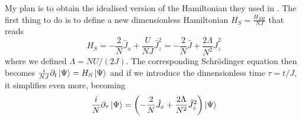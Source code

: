 My plan is to obtain the idealised version of the Hamiltonian they used in \cite{FastGenerationJulia2012}.
The first thing to do is to define a new dimensionless Hamiltonian $ H_{S} = \frac{H_{BH}}{NJ} $ that reads
\begin{equation}
	\label{eq:DimensionlessBoseHubbardHamiltonian}
	H_{S} = -\frac{2}{N}\hat{J}_x +\frac{U}{NJ}\hat{J}_z ^{2} = -\frac{2}{N} \hat{J}+ \frac{2\Lambda}{N^2}\hat{J}_z^2
\end{equation}
where we defined $ \Lambda = NU/(2J) $.
The corresponding Schr{\"o}dinger equation then becomes $ \frac{i}{NJ}\partial_t\ket{\Psi} = H_{S}\ket{\Psi} $ and if we introduce the dimensionless time $ \tau = t/J $, it simplifies even more, becoming
\begin{equation}
	\label{eq:SchrodingerEquationDimensionless}
	\frac{i}{N}\partial_{\tau} \ket{\Psi} =
	\left(
	-\frac{2}{N} \hat{J}_{x}+ \frac{2\Lambda}{N^2}\hat{J}_z^2
	\right)\ket{\Psi}
\end{equation}

